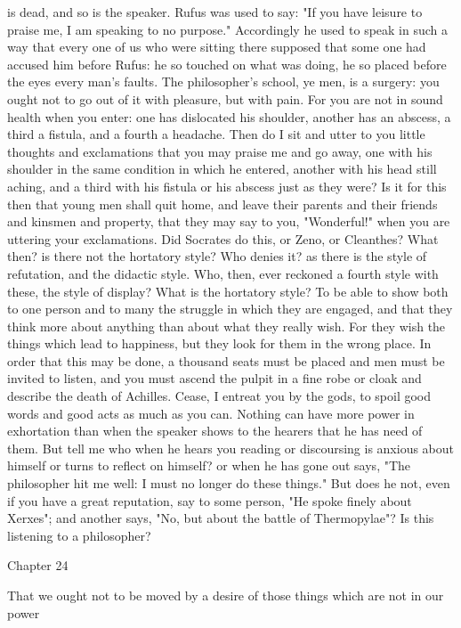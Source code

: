 \documentclass[a4paper]{article}
\begin{document}
is dead, and so is the speaker. Rufus was used to say: "If you have leisure to
praise me, I am speaking to no purpose." Accordingly he used to speak in such a
way that every one of us who were sitting there supposed that some one had
accused him before Rufus: he so touched on what was doing, he so placed before
the eyes every man's faults.
    The philosopher's school, ye men, is a surgery: you ought not to go out of
it with pleasure, but with pain. For you are not in sound health when you
enter: one has dislocated his shoulder, another has an abscess, a third a
fistula, and a fourth a headache. Then do I sit and utter to you little
thoughts and exclamations that you may praise me and go away, one with his
shoulder in the same condition in which he entered, another with his head still
aching, and a third with his fistula or his abscess just as they were? Is it
for this then that young men shall quit home, and leave their parents and their
friends and kinsmen and property, that they may say to you, "Wonderful!" when
you are uttering your exclamations. Did Socrates do this, or Zeno, or
Cleanthes?
    What then? is there not the hortatory style? Who denies it? as there is the
style of refutation, and the didactic style. Who, then, ever reckoned a fourth
style with these, the style of display? What is the hortatory style? To be able
to show both to one person and to many the struggle in which they are engaged,
and that they think more about anything than about what they really wish. For
they wish the things which lead to happiness, but they look for them in the
wrong place. In order that this may be done, a thousand seats must be placed
and men must be invited to listen, and you must ascend the pulpit in a fine
robe or cloak and describe the death of Achilles. Cease, I entreat you by the
gods, to spoil good words and good acts as much as you can. Nothing can have
more power in exhortation than when the speaker shows to the hearers that he
has need of them. But tell me who when he hears you reading or discoursing is
anxious about himself or turns to reflect on himself? or when he has gone out
says, "The philosopher hit me well: I must no longer do these things." But does
he not, even if you have a great reputation, say to some person, "He spoke
finely about Xerxes"; and another says, "No, but about the battle of
Thermopylae"? Is this listening to a philosopher?

Chapter 24

That we ought not to be moved by a desire of those things which are not in our
                                     power
\end{document}

